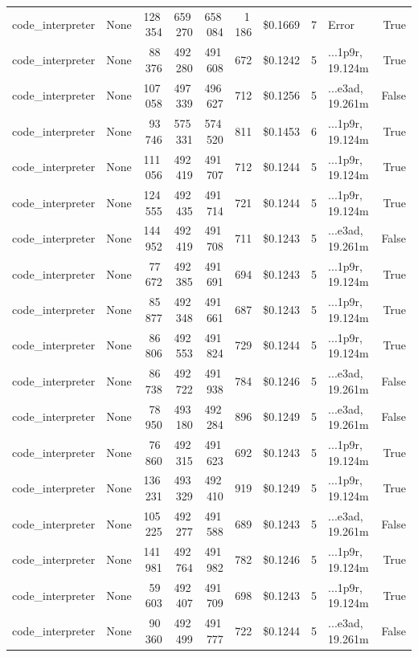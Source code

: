 \documentclass[a4paper,11pt]{article}
\begin{document}
\begin{table}[H]
{\begin{tabular}{l r r r r r r r l r}
code\_interpreter & None & 128\,354 & 659\,270 & 658\,084 & 1\,186 & \$0.1669 & 7 & Error & True \\
code\_interpreter & None & 88\,376 & 492\,280 & 491\,608 & 672 & \$0.1242 & 5 & ...1p9r, 19.124m & True \\
code\_interpreter & None & 107\,058 & 497\,339 & 496\,627 & 712 & \$0.1256 & 5 & ...e3ad, 19.261m & False \\
code\_interpreter & None & 93\,746 & 575\,331 & 574\,520 & 811 & \$0.1453 & 6 & ...1p9r, 19.124m & True \\
code\_interpreter & None & 111\,056 & 492\,419 & 491\,707 & 712 & \$0.1244 & 5 & ...1p9r, 19.124m & True \\
code\_interpreter & None & 124\,555 & 492\,435 & 491\,714 & 721 & \$0.1244 & 5 & ...1p9r, 19.124m & True \\
code\_interpreter & None & 144\,952 & 492\,419 & 491\,708 & 711 & \$0.1243 & 5 & ...e3ad, 19.261m & False \\
code\_interpreter & None & 77\,672 & 492\,385 & 491\,691 & 694 & \$0.1243 & 5 & ...1p9r, 19.124m & True \\
code\_interpreter & None & 85\,877 & 492\,348 & 491\,661 & 687 & \$0.1243 & 5 & ...1p9r, 19.124m & True \\
code\_interpreter & None & 86\,806 & 492\,553 & 491\,824 & 729 & \$0.1244 & 5 & ...1p9r, 19.124m & True \\
code\_interpreter & None & 86\,738 & 492\,722 & 491\,938 & 784 & \$0.1246 & 5 & ...e3ad, 19.261m & False \\
code\_interpreter & None & 78\,950 & 493\,180 & 492\,284 & 896 & \$0.1249 & 5 & ...e3ad, 19.261m & False \\
code\_interpreter & None & 76\,860 & 492\,315 & 491\,623 & 692 & \$0.1243 & 5 & ...1p9r, 19.124m & True \\
code\_interpreter & None & 136\,231 & 493\,329 & 492\,410 & 919 & \$0.1249 & 5 & ...1p9r, 19.124m & True \\
code\_interpreter & None & 105\,225 & 492\,277 & 491\,588 & 689 & \$0.1243 & 5 & ...e3ad, 19.261m & False \\
code\_interpreter & None & 141\,981 & 492\,764 & 491\,982 & 782 & \$0.1246 & 5 & ...1p9r, 19.124m & True \\
code\_interpreter & None & 59\,603 & 492\,407 & 491\,709 & 698 & \$0.1243 & 5 & ...1p9r, 19.124m & True \\
code\_interpreter & None & 90\,360 & 492\,499 & 491\,777 & 722 & \$0.1244 & 5 & ...e3ad, 19.261m & False \\

\end{tabular}}
\end{table}
\end{document}
